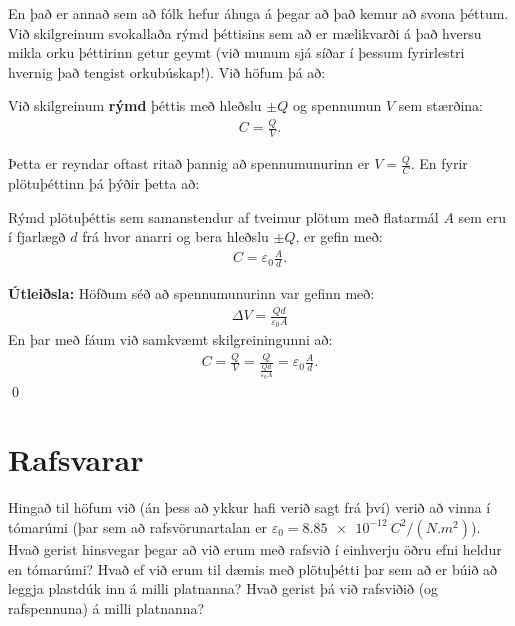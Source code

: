 \ifdefined \wholebook \else\documentclass[oneside]{book}\usepackage{EdlBook}\graphicspath{{figures/}}
\begin{document}
En það er annað sem að fólk hefur áhuga á þegar að það kemur að svona þéttum. Við skilgreinum svokallaða rýmd þéttisins sem að er mælikvarði á það hversu mikla orku þéttirinn getur geymt (við munum sjá síðar í þessum fyrirlestri hvernig það tengist orkubúskap!). Við höfum þá að:
\begin{tcolorbox}
\begin{definition}
Við skilgreinum \textbf{rýmd} þéttis með hleðslu $\pm Q$ og spennumun $V$ sem stærðina:
\begin{align*}
    C = \frac{Q}{V}.
\end{align*}
\end{definition}
\end{tcolorbox}
Þetta er reyndar oftast ritað þannig að spennumunurinn er $V = \frac{Q}{C}$. En fyrir plötuþéttinn þá þýðir þetta að:
\begin{tcolorbox}
\begin{theorem}
Rýmd plötuþéttis sem samanstendur af tveimur plötum með flatarmál $A$ sem eru í fjarlægð $d$ frá hvor anarri og bera hleðslu $\pm Q$, er gefin með:
\begin{align*}
     C = \varepsilon_0 \frac{A}{d}.
\end{align*}
\end{theorem}
\end{tcolorbox}

\textbf{Útleiðsla:} Höfðum séð að spennumunurinn var gefinn með:
\begin{align*}
    \Delta V = \frac{Qd}{\varepsilon_0 A}
\end{align*}
En þar með fáum við samkvæmt skilgreiningunni að:
\begin{align*}
    C = \frac{Q}{V} = \frac{Q}{\frac{Qd}{\varepsilon_0 A}} = \varepsilon_0 \frac{A}{d}.
\end{align*}
\qed


\section{Rafsvarar}

Hingað til höfum við (án þess að ykkur hafi verið sagt frá því) verið að vinna í tómarúmi (þar sem að rafsvörunartalan er $\varepsilon_0 = \SI{8.85e-12}{C^2/(N.m^2)}$). Hvað gerist hinsvegar þegar að við erum með rafsvið í einhverju öðru efni heldur en tómarúmi? Hvað ef við erum til dæmis með plötuþétti þar sem að er búið að leggja plastdúk inn á milli platnanna? Hvað gerist þá við rafsviðið (og rafspennuna) á milli platnanna? 
\end{document}
